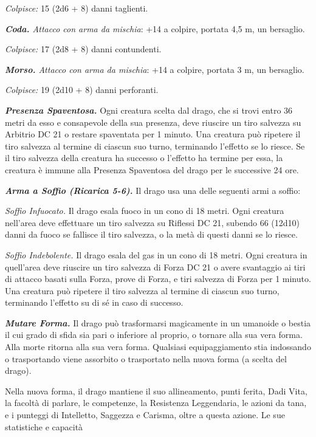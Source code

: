 \begin{multicols}{2}
\emph{Colpisce:} 15 (2d6 + 8) danni taglienti.

\emph{\textbf{Coda.} Attacco con arma da mischia}: +14 a colpire,
portata 4,5 m, un bersaglio.

\emph{Colpisce:} 17 (2d8 + 8) danni contundenti.

\emph{\textbf{Morso.} Attacco con arma da mischia}: +14 a colpire,
portata 3 m, un bersaglio.

\emph{Colpisce:} 19 (2d10 + 8) danni perforanti.

\emph{\textbf{Presenza Spaventosa.}} Ogni creatura scelta dal drago, che
si trovi entro 36 metri da esso e consapevole della sua presenza, deve
riuscire un tiro salvezza su Arbitrio DC 21 o restare spaventata per 1
minuto. Una creatura può ripetere il tiro salvezza al termine di ciascun
suo turno, terminando l'effetto se lo riesce. Se il tiro salvezza della
creatura ha successo o l'effetto ha termine per essa, la creatura è
immune alla Presenza Spaventosa del drago per le successive 24 ore.

\emph{\textbf{Arma a Soffio (Ricarica 5-6).}} Il drago usa una delle
seguenti armi a soffio:

\emph{Soffio Infuocato.} Il drago esala fuoco in un cono di 18 metri.
Ogni creatura nell'area deve effettuare un tiro salvezza su Riflessi DC
21, subendo 66 (12d10) danni da fuoco se fallisce il tiro salvezza, o la
metà di questi danni se lo riesce.

\emph{Soffio Indebolente.} Il drago esala del gas in un cono di 18
metri. Ogni creatura in quell'area deve riuscire un tiro salvezza di Forza DC 21 o avere svantaggio ai tiri di attacco basati sulla Forza,
prove di Forza, e tiri salvezza di Forza per 1 minuto. Una creatura può
ripetere il tiro salvezza al termine di ciascun suo turno, terminando
l'effetto su di sé in caso di successo.

\emph{\textbf{Mutare Forma.}} Il drago può trasformarsi magicamente in
un umanoide o bestia il cui grado di sfida sia pari o inferiore al
proprio, o tornare alla sua vera forma. Alla morte ritorna alla sua vera
forma. Qualsiasi equipaggiamento stia indossando o trasportando viene
assorbito o trasportato nella nuova forma (a scelta del drago).

Nella nuova forma, il drago mantiene il suo allineamento, punti ferita,
Dadi Vita, la facoltà di parlare, le competenze, la Resistenza
Leggendaria, le azioni da tana, e i punteggi di Intelletto, Saggezza e
Carisma, oltre a questa azione. Le sue statistiche e capacità


\end{multicols}
